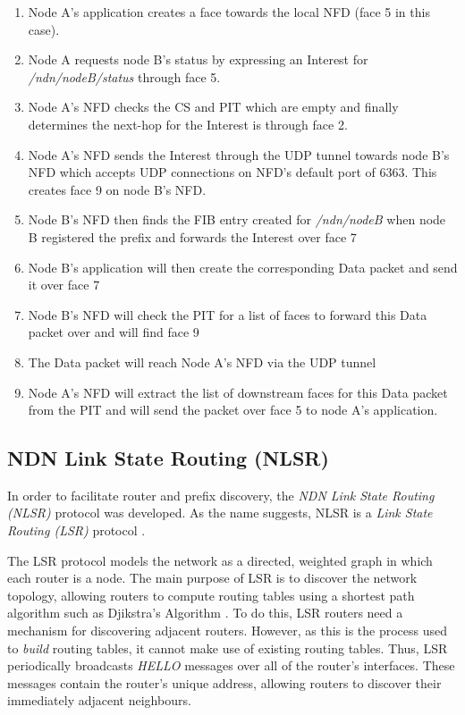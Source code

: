 \begin{enumerate}
    \item Node A's application creates a face towards the local NFD (face 5 in this case).
    \item Node A requests node B's status by expressing an Interest for \textit{/ndn/nodeB/status} through face 5.
    \item Node A's NFD checks the CS and PIT which are empty and finally determines the next-hop for the Interest is through face 2.
    \item Node A's NFD sends the Interest through the UDP tunnel towards node B's NFD which accepts UDP connections on NFD's default port of 6363. This creates face 9 on node B's NFD.
    \item Node B's NFD then finds the FIB entry created for \textit{/ndn/nodeB} when node B registered the prefix and forwards the Interest over face 7
    \item Node B's application will then create the corresponding Data packet and send it over face 7
    \item Node B's NFD will check the PIT for a list of faces to forward this Data packet over and will find face 9
    \item The Data packet will reach Node A's NFD via the UDP tunnel
    \item Node A's NFD will extract the list of downstream faces for this Data packet from the PIT and will send the packet over face 5 to node A's application.
\end{enumerate}





\subsection{NDN Link State Routing (NLSR)}\label{sec:NLSR}
In order to facilitate router and prefix discovery, the \textit{NDN Link State Routing (NLSR)} protocol was developed. As the name suggests, NLSR is a \textit{Link State Routing (LSR)} protocol \cite{lsr-rfc}. 

The LSR protocol models the network as a directed, weighted graph in which each router is a node. The main purpose of LSR is to discover the network topology, allowing routers to compute routing tables using a shortest path algorithm such as Djikstra's Algorithm \cite{djikstra}\cite{lsr}. To do this, LSR routers need a mechanism for discovering adjacent routers. However, as this is the process used to \textit{build} routing tables, it cannot make use of existing routing tables. Thus, LSR periodically broadcasts \textit{HELLO} messages over all of the router's interfaces. These messages contain the router's unique address, allowing routers to discover their immediately adjacent neighbours. 

